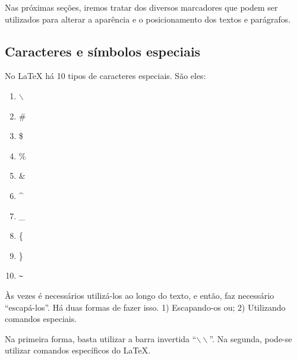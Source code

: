 Nas próximas seções, iremos tratar dos diversos marcadores que podem ser utilizados para alterar a aparência e o posicionamento dos textos e parágrafos.

\subsection{Caracteres e símbolos especiais}
\label{sec:carac_especiais}

No LaTeX há 10 tipos de caracteres especiais. São eles:

\begin{multicols}{5}
    \begin{enumerate}
        \item $\backslash$
        \item \#
        \item \$
        \item \%
        \item \&
        \item \^{}
        \item \_
        \item \{
        \item \}
        \item \texttt{\~{}}
    \end{enumerate}
\end{multicols}


Às vezes é necessários utilizá-los ao longo do texto, e então, faz necessário ``escapá-los''. Há duas formas de fazer isso. 1) Escapando-os ou; 2) Utilizando comandos especiais.

Na primeira forma, basta utilizar a barra invertida ``$\backslash\backslash$''. Na segunda, pode-se utilizar comandos específicos do LaTeX. 

%

